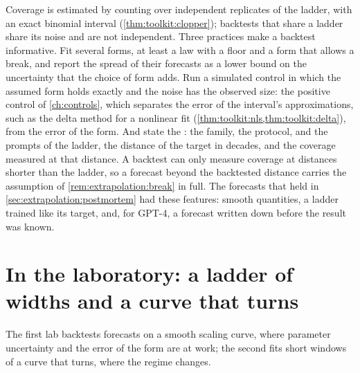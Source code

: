\begin{refsection}
Coverage is estimated by counting over independent replicates of the ladder, with an exact binomial interval (\cref{thm:toolkit:clopper}); backtests that share a ladder share its noise and are not independent. Three practices make a backtest informative. Fit several forms, at least a law with a floor and a form that allows a break, and report the spread of their forecasts as a lower bound on the uncertainty that the choice of form adds. Run a simulated control in which the assumed form holds exactly and the noise has the observed size: the positive control of \cref{ch:controls}, which separates the error of the interval's approximations, such as the delta method for a nonlinear fit (\cref{thm:toolkit:nls,thm:toolkit:delta}), from the error of the form. And state the : the family, the protocol, and the prompts of the ladder, the distance of the target in decades, and the coverage measured at that distance. A backtest can only measure coverage at distances shorter than the ladder, so a forecast beyond the backtested distance carries the assumption of \cref{rem:extrapolation:break} in full. The forecasts that held in \cref{sec:extrapolation:postmortem} had these features: smooth quantities, a ladder trained like its target, and, for GPT-4, a forecast written down before the result was known.

\section{In the laboratory: a ladder of widths and a curve that turns}\label{sec:extrapolation:lab}

The first lab backtests forecasts on a smooth scaling curve, where parameter uncertainty and the error of the form are at work; the second fits short windows of a curve that turns, where the regime changes.


\end{refsection}
